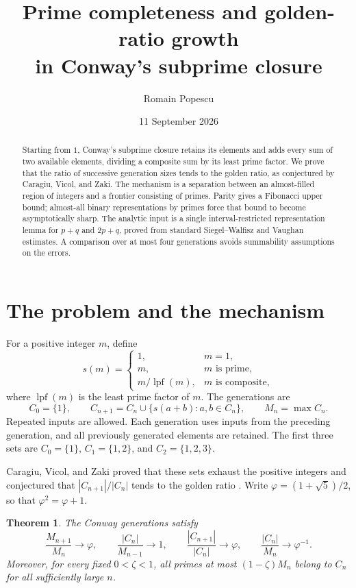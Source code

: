 \documentclass[11pt,letterpaper]{article}
\title{Prime completeness and golden-ratio growth\\
in Conway's subprime closure}
\author{Romain Popescu}
\date{11 September 2026}
\numberwithin{equation}{section}
\newtheorem{theorem}{Theorem}[section]
\theoremstyle{definition}
\theoremstyle{remark}
\DeclareMathOperator{\lpf}{lpf}
\newcommand{\ph}{\varphi}
\begin{document}
\maketitle

\begin{abstract}
Starting from $1$, Conway's subprime closure retains its elements and adds
every sum of two available elements, dividing a composite sum by its least
prime factor. We prove that the ratio of successive generation sizes tends
to the golden ratio, as conjectured by Caragiu, Vicol, and Zaki.
The mechanism is a separation between an almost-filled region of integers
and a frontier consisting of primes. Parity gives a Fibonacci upper bound;
almost-all binary representations by primes force that bound to become
asymptotically sharp. The analytic input is a single interval-restricted
representation lemma for $p+q$ and $2p+q$, proved from standard
Siegel--Walfisz and Vaughan estimates. A comparison over at most four
generations avoids summability assumptions on the errors.
\end{abstract}

\section{The problem and the mechanism}
\label{sec:introduction}

For a positive integer $m$, define
\[
 s(m)=\begin{cases}
  1,&m=1,\\
  m,&m\text{ is prime},\\
  m/\lpf(m),&m\text{ is composite},
 \end{cases}
\]
where $\lpf(m)$ is the least prime factor of $m$. The generations are
\begin{equation}\label{eq:generations}
 C_0=\{1\},\qquad
 C_{n+1}=C_n\cup\{s(a+b):a,b\in C_n\},\qquad M_n=\max C_n.
\end{equation}
Repeated inputs are allowed. Each generation uses inputs from the preceding
generation, and all previously generated elements are retained.
The first three sets are $C_0=\{1\}$, $C_1=\{1,2\}$, and
$C_2=\{1,2,3\}$.

Caragiu, Vicol, and Zaki proved that these sets exhaust the positive
integers and conjectured that $|C_{n+1}|/|C_n|$ tends to the golden ratio
\cite[Theorem~1 and Conjecture~3]{CVZ}. Write
$\ph=(1+\sqrt5)/2$, so that $\ph^2=\ph+1$.

\begin{theorem}\label{thm:main}
The Conway generations satisfy
\begin{equation}\label{eq:main-limits}
 \frac{M_{n+1}}{M_n}\longrightarrow\ph,\qquad
 \frac{|C_n|}{M_{n-1}}\longrightarrow1,\qquad
 \frac{|C_{n+1}|}{|C_n|}\longrightarrow\ph,\qquad
 \frac{|C_n|}{M_n}\longrightarrow\ph^{-1}.
\end{equation}
Moreover, for every fixed $0<\zeta<1$, all primes at most
$(1-\zeta)M_n$ belong to $C_n$ for all sufficiently large $n$.
\end{theorem}
\end{document}
